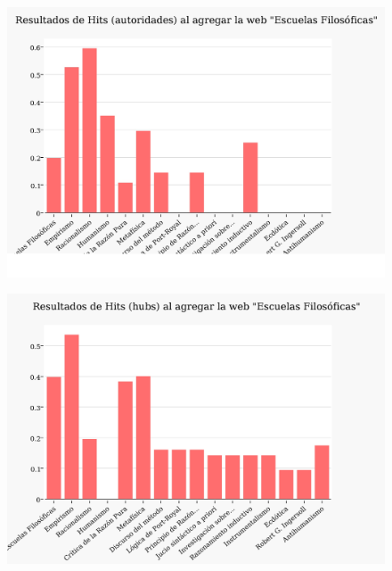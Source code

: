 \documentclass[a4paper]{article}
\begin{document}
\begin{figure}
  \begin{center}
	\includegraphics[scale=0.3]{imagenes/Exp2/hitsa2nuevo}
	\label{pr2}
  \end{center}
\end{figure}

\begin{figure}
 \begin{center}
	\includegraphics[scale=0.3]{imagenes/Exp2/hitsH2}
	\label{hitsh2}
  \end{center}
\end{figure}
\end{document}
